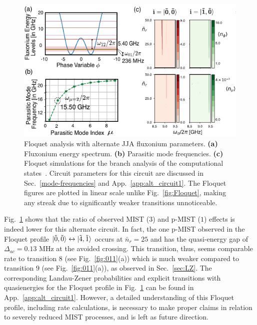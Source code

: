 \documentclass[%
reprint,
superscriptaddress,
 amsmath,amssymb,
 aps,
 prx,
longbibliography,
floatfix,
]{revtex4-2}
\newcommand{\singh}[1]{{\color{orange}{{}#1}}}%
\begin{document}
\begin{figure}[htb]
    \centering
    \includegraphics[width=\linewidth]{Figures/Floquet_Will.pdf}
    \caption{Floquet analysis with alternate JJA fluxonium parameters. \textbf{(a)} Fluxonium energy spectrum. \textbf{(b)} Parasitic mode frequencies. \textbf{(c)} Floquet simulations for the branch analysis of the computational states~\cite{ding2023high}. Circuit parameters for this circuit are discussed in Sec.~\ref{mode-frequencies} and App.~\ref{app:alt_circuit1}. The Floquet figures are plotted in linear scale unlike Fig.~\ref{fig:Floquet}, making any streak due to significantly weaker transitions \singh{($\Delta_{ac}<1$ KHz)} unnoticeable.}
    \label{fig:Floquet1}
\end{figure}

Fig.~\ref{fig:Floquet1} shows that the ratio of observed MIST ($3$) and p-MIST ($1$) effects is indeed lower for this alternate circuit. In fact, the one p-MIST observed in the Floquet profile $\ket{\tilde{0},\tilde{0}}\leftrightarrow\ket{\tilde{4},\tilde{1}}$ occurs at $\bar n_r=25$ and has the quasi-energy gap of $\Delta_{ac}=0.13$ MHz at the avoided crossing. This transition, thus, seems comparable rate to transition $8$ (see Fig.~\ref{fig:011}(a)) which is much weaker compared to transition $9$ (see Fig.~\ref{fig:011}(a)), as observed in Sec.~\ref{sec:LZ}. The corresponding Landau-Zener probabilities and explicit transitions with quasienergies for the Floquet profile in Fig.~\ref{fig:Floquet1} can be found in App.~\ref{app:alt_circuit1}. However, a detailed understanding of this Floquet profile, including rate calculations, is necessary to make proper claims in relation to severely reduced MIST processes, and is left as future direction.
\end{document}
